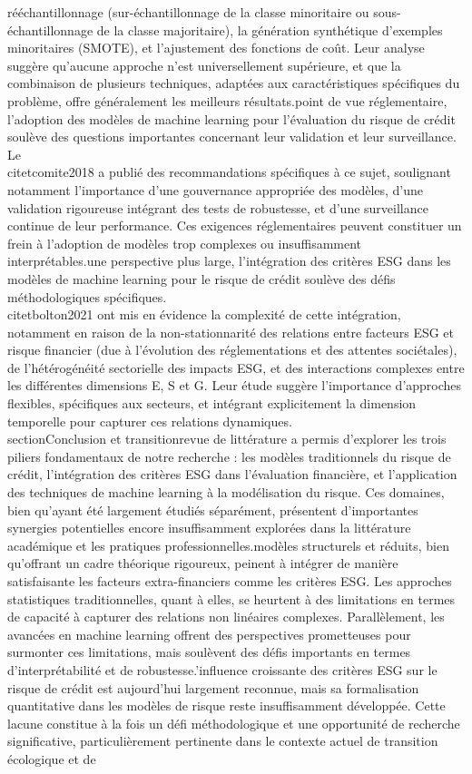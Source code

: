 rééchantillonnage (sur-échantillonnage de la classe minoritaire ou sous-échantillonnage de la classe majoritaire), la génération synthétique d'exemples minoritaires (SMOTE), et l'ajustement des fonctions de coût. Leur analyse suggère qu'aucune approche n'est universellement supérieure, et que la combinaison de plusieurs techniques, adaptées aux caractéristiques spécifiques du problème, offre généralement les meilleurs résultats.\n\nDu point de vue réglementaire, l'adoption des modèles de machine learning pour l'évaluation du risque de crédit soulève des questions importantes concernant leur validation et leur surveillance. Le \\citet{comite2018} a publié des recommandations spécifiques à ce sujet, soulignant notamment l'importance d'une gouvernance appropriée des modèles, d'une validation rigoureuse intégrant des tests de robustesse, et d'une surveillance continue de leur performance. Ces exigences réglementaires peuvent constituer un frein à l'adoption de modèles trop complexes ou insuffisamment interprétables.\n\nDans une perspective plus large, l'intégration des critères ESG dans les modèles de machine learning pour le risque de crédit soulève des défis méthodologiques spécifiques. \\citet{bolton2021} ont mis en évidence la complexité de cette intégration, notamment en raison de la non-stationnarité des relations entre facteurs ESG et risque financier (due à l'évolution des réglementations et des attentes sociétales), de l'hétérogénéité sectorielle des impacts ESG, et des interactions complexes entre les différentes dimensions E, S et G. Leur étude suggère l'importance d'approches flexibles, spécifiques aux secteurs, et intégrant explicitement la dimension temporelle pour capturer ces relations dynamiques.\n\n\\section{Conclusion et transition}\n\nCette revue de littérature a permis d'explorer les trois piliers fondamentaux de notre recherche : les modèles traditionnels du risque de crédit, l'intégration des critères ESG dans l'évaluation financière, et l'application des techniques de machine learning à la modélisation du risque. Ces domaines, bien qu'ayant été largement étudiés séparément, présentent d'importantes synergies potentielles encore insuffisamment explorées dans la littérature académique et les pratiques professionnelles.\n\nLes modèles structurels et réduits, bien qu'offrant un cadre théorique rigoureux, peinent à intégrer de manière satisfaisante les facteurs extra-financiers comme les critères ESG. Les approches statistiques traditionnelles, quant à elles, se heurtent à des limitations en termes de capacité à capturer des relations non linéaires complexes. Parallèlement, les avancées en machine learning offrent des perspectives prometteuses pour surmonter ces limitations, mais soulèvent des défis importants en termes d'interprétabilité et de robustesse.\n\nL'influence croissante des critères ESG sur le risque de crédit est aujourd'hui largement reconnue, mais sa formalisation quantitative dans les modèles de risque reste insuffisamment développée. Cette lacune constitue à la fois un défi méthodologique et une opportunité de recherche significative, particulièrement pertinente dans le contexte actuel de transition écologique et de 